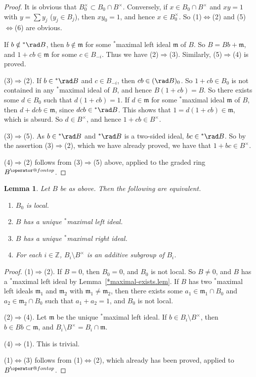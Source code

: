 \documentclass[11pt,leqno]{article}
\makeatletter
\newtheorem{lemma}[theorem]{Lemma}
\theoremstyle{definition}
\theoremstyle{remark}
\theoremstyle{remark}
\let\Mathrm\operator@font
\newcommand{\fm}{\ensuremath{\mathfrak m}}
\def\standop#1{\mathop{\Mathrm #1}\nolimits}
\def\op{^{\standop{op}}}
\def\fm{\mathfrak{m}}
\def\ZZ{{\mathbb{Z}}}
\makeatother
\begin{document}
\begin{proof}
  It is obvious that $B_0^\times\subset B_0\cap B^\times$.
  Conversely, if $x\in B_0\cap B^\times$ and $xy=1$ with $y=\sum y_j$ ($y_j\in B_j$),
  then $xy_0=1$, and hence $x\in B_0^\times$.
  So (1)$\Leftrightarrow$(2) and (5)$\Leftrightarrow$(6) are obvious.

  If $b\notin{}^*\rad B$, then $b\notin \fm$ for some ${}^*$maximal left ideal $\fm$ of $B$.
  So $B=Bb+\fm$, and $1+cb\in\fm$ for some $c\in B_{-i}$.
  Thus we have (2)$\Rightarrow$(3).
  Similarly, (5)$\Rightarrow$(4) is proved.
  
  (3)$\Rightarrow$(2).
If $b\in{}^*\rad B$ and $c\in B_{-i}$, then $cb\in(\rad B)_0$.
  So $1+cb\in B_0$ is not contained in any ${}^*$maximal ideal of $B$, and hence
  $B(1+cb)=B$.
  So there exists some $d\in B_0$ such that $d(1+cb)=1$.
  If $d\in\fm$ for some ${}^*$maximal ideal $\fm$ of $B$, then $d+dcb\in\fm$, 
  since $dcb\in{}^*\rad B$.
  This shows that $1=d(1+cb)\in\fm$, which is absurd.
  So $d\in B^\times$, and hence $1+cb\in B^\times$.

  (3)$\Rightarrow$(5).
  As $b\in{}^*\rad B$ and ${}^*\rad B$ is a two-sided ideal, $bc\in{}^*\rad B$.
  So by the assertion (3)$\Rightarrow$(2), which we have already proved, we have
  that $1+bc\in B^\times$.

  (4)$\Rightarrow$(2) follows from (3)$\Rightarrow$(5) above, applied to the
  graded ring $B\op$.
\end{proof}

\begin{lemma}\label{*local.lem}
  Let $B$ be as above.
  Then the following are equivalent.
  \begin{enumerate}
  \item[\rm(1)] $B_0$ is local.
  \item[\rm(2)] $B$ has a unique ${}^*$maximal left ideal.
  \item[\rm(3)] $B$ has a unique ${}^*$maximal right ideal.
  \item[\rm(4)] For each $i\in\ZZ$, $B_i\setminus B^\times$ is an additive subgroup of $B_i$.
  \end{enumerate}
\end{lemma}

\begin{proof}
  (1)$\Rightarrow$(2).
  If $B=0$, then $B_0=0$, and $B_0$ is not local.
  So $B\neq 0$, and $B$ has a ${}^*$maximal left ideal by Lemma~\ref{*maximal-exists.lem}.
  If $B$ has two ${}^*$maximal left ideals $\fm_1$ and $\fm_2$ with $\fm_1\neq\fm_2$,
  then there exists some $a_1\in\fm_1\cap B_0$ and $a_2\in\fm_2\cap B_0$ such that
  $a_1+a_2=1$, and $B_0$ is not local.

  (2)$\Rightarrow$(4).
  Let $\fm$ be the unique ${}^*$maximal left ideal.
  If $b\in B_i\setminus B^\times$, then $b\in Bb\subset\fm$, and
  $B_i\setminus B^\times=B_i\cap \fm$.

  (4)$\Rightarrow$(1).
  This is trivial.

  (1)$\Leftrightarrow$(3) follows from (1)$\Leftrightarrow$(2), which already has been proved,
  applied to $B\op$.
\end{proof}
\end{document}
